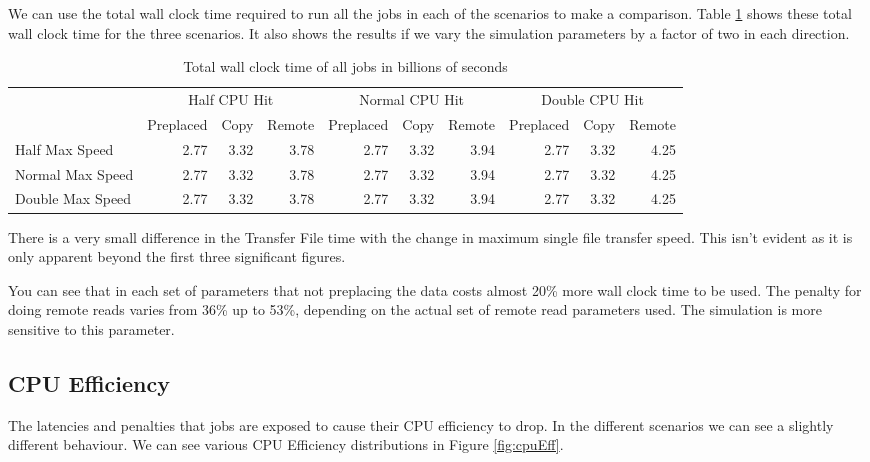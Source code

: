 \documentclass[a4paper]{jpconf}
\begin{document}
We can use the total wall clock time required to run all the jobs in
each of the scenarios to make a comparison. Table \ref{tab:wallClock}
shows these total wall clock time for the three scenarios. It also
shows the results if we vary the simulation parameters by a factor of
two in each direction.


\begin{table}
  \begin{center}
    \begin{scriptsize}
      \begin{tabular}{|l|rrr|rrr|rrr|}
        \hline
        & \multicolumn{3}{|c|}{Half CPU Hit} & \multicolumn{3}{|c|}{Normal CPU
          Hit} & \multicolumn{3}{|c|}{Double CPU Hit} \\
        \cline{2-10}
        & Preplaced & Copy & Remote & Preplaced & Copy & Remote
        & Preplaced & Copy & Remote \\
        \hline
        Half Max Speed & 2.77 & 3.32 & 3.78 & 2.77 & 3.32 & 3.94 & 2.77
        & 3.32 & 4.25 \\
        Normal Max Speed & 2.77 & 3.32 & 3.78 & 2.77 & 3.32 & 3.94 & 2.77
        & 3.32 & 4.25 \\
        Double Max Speed & 2.77 & 3.32 & 3.78 & 2.77 & 3.32 & 3.94 & 2.77
        & 3.32 & 4.25 \\
        \hline
      \end{tabular}
      \caption{Total wall clock time of all jobs in billions of seconds\label{tab:wallClock}}
    \end{scriptsize}
  \end{center}
\end{table}

There is a very small difference in the Transfer File time with the
change in maximum single file transfer speed. This isn't evident as it
is only apparent beyond the first three significant figures.

You can see that in each set of parameters that not preplacing the
data costs almost 20\% more wall clock time to be used. The penalty
for doing remote reads varies from 36\% up to 53\%, depending on the
actual set of remote read parameters used. The simulation is more
sensitive to this parameter.

\subsection{CPU Efficiency}

The latencies and penalties that jobs are exposed to cause their CPU
efficiency to drop. In the different scenarios we can see a slightly
different behaviour. We can see various CPU Efficiency distributions in
Figure \ref{fig:cpuEff}.
\end{document}
